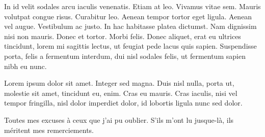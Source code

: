 \documentclass[../hdr.tex]{subfiles}
\begin{document}
In id velit sodales arcu iaculis venenatis. Etiam at leo. Vivamus vitae sem.
Mauris volutpat congue risus. Curabitur leo. Aenean tempor tortor eget ligula.
Aenean vel augue. Vestibulum ac justo. In hac habitasse platea dictumst. Nam
dignissim nisi non mauris. Donec et tortor. Morbi felis. Donec aliquet, erat eu
ultrices tincidunt, lorem mi sagittis lectus, ut feugiat pede lacus quis sapien.
Suspendisse porta, felis a fermentum interdum, dui nisl sodales felis, ut
fermentum sapien nibh eu nunc.

Lorem ipsum dolor sit amet. Integer sed magna. Duis nisl nulla, porta ut,
molestie sit amet, tincidunt eu, enim. Cras eu mauris. Cras iaculis, nisi vel
tempor fringilla, nisl dolor imperdiet dolor, id lobortis ligula nunc sed dolor.

\bigskip

Toutes mes excuses à ceux que j'ai pu oublier. S'ils m'ont lu jusque-là, ils
méritent mes remerciements.
\end{document}
